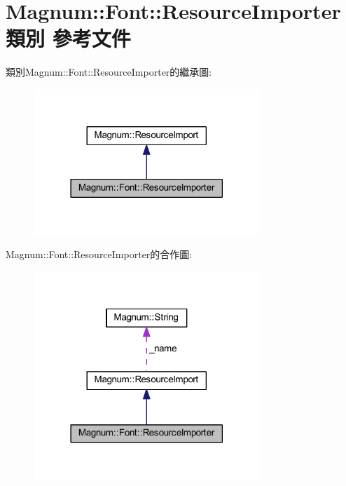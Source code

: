 \hypertarget{class_magnum_1_1_font_1_1_resource_importer}{}\section{Magnum\+:\+:Font\+:\+:Resource\+Importer 類別 參考文件}
\label{class_magnum_1_1_font_1_1_resource_importer}


類別\+Magnum\+:\+:Font\+:\+:Resource\+Importer的繼承圖\+:\nopagebreak
\begin{figure}[H]
\begin{center}
\leavevmode
\includegraphics[width=242pt]{class_magnum_1_1_font_1_1_resource_importer__inherit__graph}
\end{center}
\end{figure}


Magnum\+:\+:Font\+:\+:Resource\+Importer的合作圖\+:\nopagebreak
\begin{figure}[H]
\begin{center}
\leavevmode
\includegraphics[width=242pt]{class_magnum_1_1_font_1_1_resource_importer__coll__graph}
\end{center}
\end{figure}

